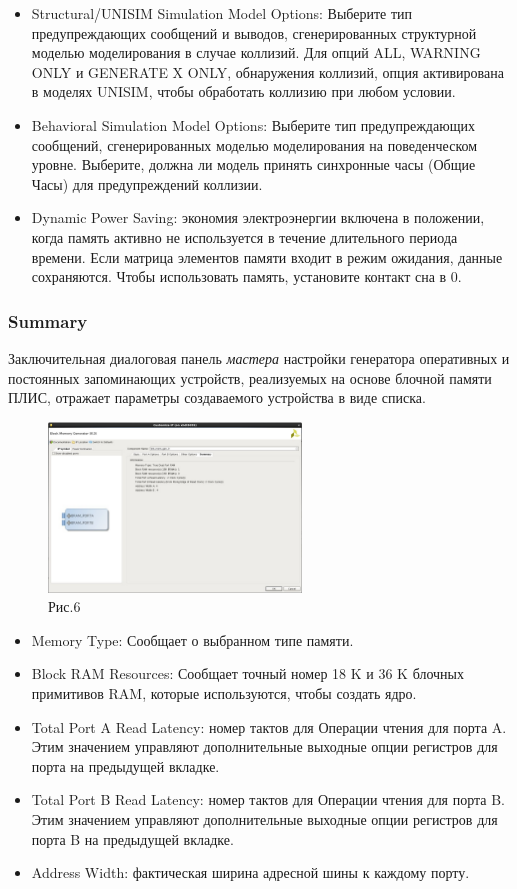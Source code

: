 \begin{itemize}
\item Structural/UNISIM Simulation Model Options: Выберите тип предупреждающих сообщений и выводов, сгенерированных структурной моделью моделирования в случае коллизий. Для опций ALL, WARNING ONLY и GENERATE X ONLY, обнаружения коллизий, опция активирована в моделях UNISIM, чтобы обработать коллизию при любом условии.
\item Behavioral Simulation Model Options: Выберите тип предупреждающих сообщений, сгенерированных моделью моделирования на поведенческом уровне. Выберите, должна ли модель принять синхронные часы (Общие Часы) для предупреждений коллизии.
\item Dynamic Power Saving: экономия электроэнергии включена в положении, когда память активно не используется в течение длительного периода времени. Если матрица элементов памяти входит в режим ожидания, данные сохраняются. Чтобы использовать память, установите контакт сна в 0.
\end{itemize}

\subsubsection{Summary}

Заключительная диалоговая панель \emph {мастера} настройки генератора оперативных и постоянных запоминающих устройств, реализуемых на основе блочной памяти ПЛИС, отражает параметры создаваемого устройства в виде списка.

\begin{figure}[h]
\centering
\includegraphics[width=0.6\textwidth]{6}
\caption{Рис.6}
\label{6_label}
\end{figure}

\begin{itemize}
\item Memory Type: Сообщает о выбранном типе памяти.
\item Block RAM Resources: Сообщает точный номер 18 K и 36 K блочных примитивов RAM, которые используются, чтобы создать ядро.
\item Total Port A Read Latency: номер тактов для Операции чтения для порта A. Этим значением управляют дополнительные выходные опции регистров для порта на предыдущей вкладке.
\item Total Port B Read Latency: номер тактов для Операции чтения для порта B. Этим значением управляют дополнительные выходные опции регистров для порта B на предыдущей вкладке.
\item Address Width: фактическая ширина адресной шины к каждому порту.
\end{itemize}

